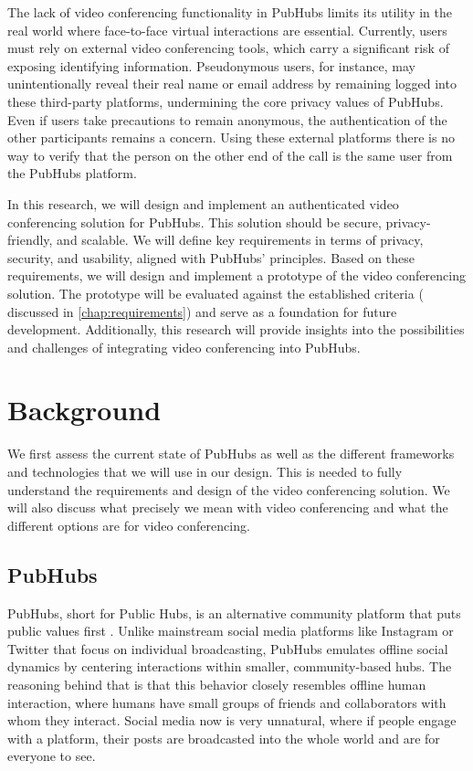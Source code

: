 \documentclass{report}
\begin{document}
The lack of video conferencing functionality in PubHubs limits its utility in the real world where face-to-face
virtual interactions are essential. Currently, users must rely on external video conferencing tools, which carry a
significant risk of exposing identifying information. Pseudonymous users, for instance, may unintentionally reveal
their real name or email address by remaining logged into these third-party platforms, undermining the core privacy
values of PubHubs. Even if users take precautions to remain anonymous, the authentication of the other participants
remains a concern. Using these external platforms there is no way to verify that the person on the other end of the
call is the same user from the PubHubs platform.

In this research, we will design and implement an authenticated video conferencing solution for PubHubs. This
solution should be secure, privacy-friendly, and scalable. We will define key requirements in terms of privacy,
security, and usability, aligned with PubHubs’ principles. Based on these requirements, we will design and implement
a prototype of the video conferencing solution. The prototype will be evaluated against the established criteria (
discussed in \autoref{chap:requirements}) and serve as a foundation for future development. Additionally, this
research will provide insights into the possibilities and challenges of integrating video conferencing into PubHubs.


\chapter{Background}
We first assess the current state of PubHubs as well as the different frameworks and technologies that we will use in
our design. This is needed to fully understand the requirements and design of the video conferencing solution. We
will also discuss what precisely we mean with video conferencing and what the different options are for video
conferencing.

\section{PubHubs}
PubHubs, short for Public Hubs, is an alternative community platform that puts public values first
\cite{jacobs_pubhubs_2023}. Unlike mainstream social media platforms like Instagram or Twitter that focus on
individual broadcasting, PubHubs emulates offline social dynamics by centering interactions within smaller,
community-based hubs. The reasoning
behind that is that this behavior closely resembles offline human interaction, where humans have small groups of
friends and collaborators with whom they interact. Social media now is very unnatural, where if people engage with a
platform, their posts are broadcasted into the whole world and are for everyone to see.
\end{document}
